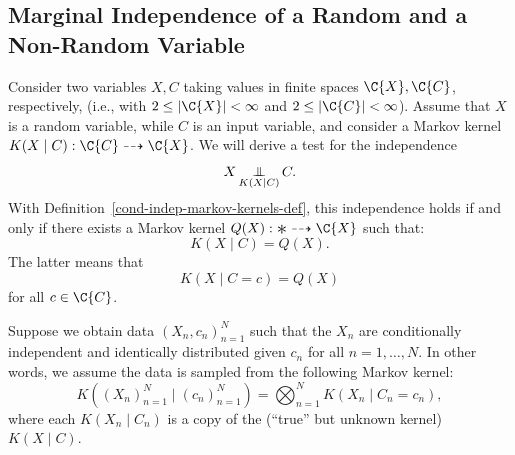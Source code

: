 \subsection{Marginal Independence of a Random and a Non-Random Variable}

Consider two variables $X,C$ taking values in finite spaces $\C{X},\C{C}$, respectively,
(i.e., with $2\le|\C{X}|<\infty$ and $2\le|\C{C}|<\infty$).
Assume that $X$ is a random variable, while $C$ is an input variable, 
and consider a Markov kernel $K(X\mid C) : \C{C} \dshto \C{X}$. 
We will derive a test for the independence $$X \operatorname*{\perp\mkern-11mu\perp}_{K(X\mid C)} C.$$
With Definition~\ref{cond-indep-markov-kernels-def}, this independence holds
if and only if there exists a Markov kernel $Q(X) : \Asterisk \dshto \C{X}$ such that:
\[ K(X\mid C) = Q(X).\]
The latter means that
\begin{equation}\label{eq:indep_test_CX}
  K(X \mid C=c) = Q(X)
\end{equation}
for all $c \in \C{C}$.

Suppose we obtain data $(X_n,c_n)_{n=1}^N$ such that the
$X_n$ are conditionally independent and identically distributed given $c_n$ for all $n=1,\dots,N$.
In other words, we assume the data is sampled from the following Markov kernel:
$$K((X_n)_{n=1}^N \mid (c_n)_{n=1}^N) = \bigotimes_{n=1}^N K(X_n \mid C_n=c_n),$$
where each $K(X_n \mid C_n)$ is a copy of the (``true'' but unknown kernel) $K(X \mid C)$.

